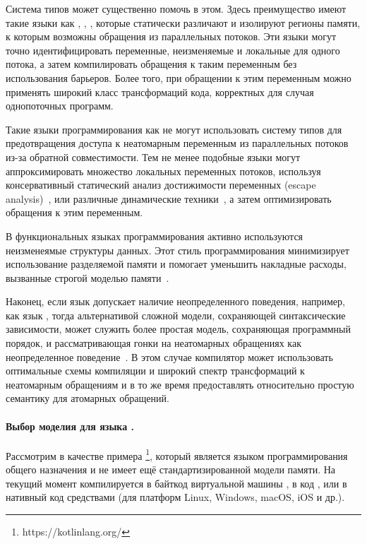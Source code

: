 Система типов может существенно помочь в этом. 
Здесь преимущество имеют такие языки как \Haskell, \OCaml, \Rust, 
которые статически различают и изолируют регионы памяти, 
к которым возможны обращения из параллельных потоков. 
Эти языки могут точно идентифицировать переменные, неизменяемые и локальные для одного потока, 
а затем компилировать обращения к таким переменным без использования барьеров. 
Более того, при обращении к этим переменным 
можно применять широкий класс трансформаций кода, 
корректных для случая однопоточных программ.
 
Такие языки программирования как  \Java не могут
использовать систему типов для предотвращения 
доступа к неатомарным переменным из параллельных потоков
из-за обратной совместимости.
Тем не менее подобные языки
могут аппроксимировать множество локальных переменных потоков,  используя консервативный 
статический анализ достижимости переменных 
(escape analysis)~\cite{Choi-al:OOPSLA1999}, 
или различные динамические техники~\cite{Liu-al:PLDI19},
а затем оптимизировать обращения к этим переменным.  

В функциональных языках программирования активно используются  неизменеямые структуры данных. Этот стиль программирования минимизирует
использование разделяемой памяти и помогает 
уменьшить накладные расходы, вызванные 
строгой моделью памяти~\cite{Vollmer-al:PPoPP17}.  

Наконец, если язык допускает наличие неопределенного поведения, 
например, как язык \CPP, тогда альтернативой сложной модели, 
сохраняющей синтаксические зависимости, 
может служить более простая модель, сохраняющая программный порядок, 
и рассматривающая гонки на неатомарных обращениях как 
неопределенное поведение~\cite{Boehm-Demsky:MSPC14, Ou-Demsky:OOPSLA18}.
В этом случае компилятор может использовать оптимальные 
схемы компиляции и широкий спектр трансформаций  к неатомарным обращениям
и в то же время предоставлять относительно простую семантику для атомарных обращений. 

\paragraph{Выбор моделия для языка \Kotlin.}

Рассмотрим в качестве примера \Kotlin\footnote{https://kotlinlang.org/}, который является языком программирования общего назначения и не имеет ещё стандартизированной модели памяти. 
На текущий момент \Kotlin  компилируется  в байткод виртуальной машины \Java, в код \JS, 
или в нативный код средствами \LLVM
(для платформ Linux, Windows, macOS, iOS и др.).

